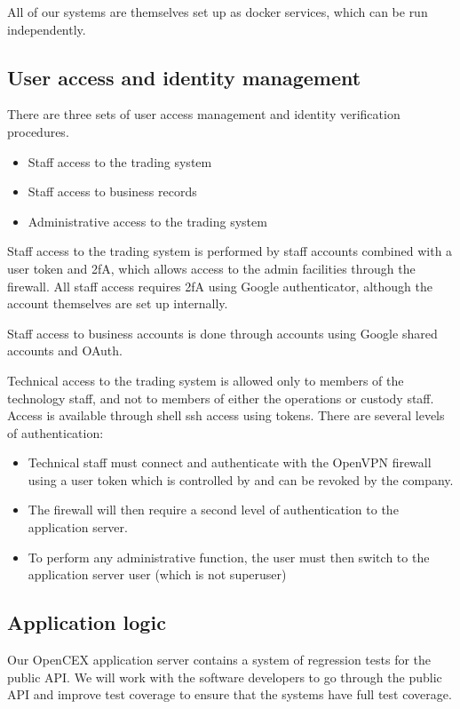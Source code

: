 All of our systems are themselves set up as docker services, which can
be run independently.

\subsection{User access and identity management}

There are three sets of user access management and identity
verification procedures.
\begin{itemize}
\item Staff access to the trading system
\item Staff access to business records
\item Administrative access to the trading system
\end{itemize}

Staff access to the trading system is performed by staff accounts
combined with a user token and 2fA, which allows access to the admin
facilities through the firewall.  All staff access requires 2fA using
Google authenticator, although the account themselves are set up
internally.

Staff access to business accounts is done through accounts using
Google shared accounts and OAuth.

Technical access to the trading system is allowed only to members of
the technology staff, and not to members of either the operations or
custody staff.  Access is available through shell ssh access using
tokens.  There are several levels of authentication:

\begin{itemize}
\item Technical staff must connect and authenticate with the OpenVPN
firewall using a user token which is controlled by and can be revoked
by the company.
\item The firewall will then require a second level of authentication to
the application server.
\item To perform any administrative function, the user must then switch
  to the application server user (which is not superuser)
\end{itemize}


\subsection{Application logic}
Our OpenCEX application server contains a system of regression tests for the
public API.  We will work with the software developers to go through
the public API and improve test coverage to ensure that the systems
have full test coverage.

